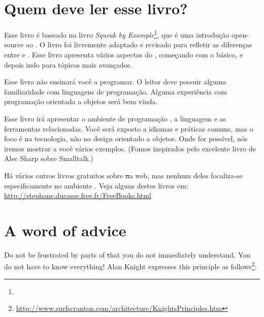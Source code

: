 \documentclass[a4paper,10pt,twoside]{book}
\begin{document}
\section*{Quem deve ler esse livro?}

Esse livro é baseado no livro \emph{Squeak by Example}\footnote{\sbe}, que é uma introdução open-source ao \squeak.
O livro foi livremente adaptado e revisado para refletir as diferenças entre \pharo e \squeak.
Esse livro apresenta vários aspectos do \pharo, começando com o básico, e depois indo para tópicos mais avançados.

Esse livro não ensinará você a programar. O leitor deve possuir alguma familiaridade com linguagens de programação. Alguma experiência com programação orientada a objetos será bem vinda.

Esse livro irá apresentar o ambiente de programação \pharo, a linguagem e as ferramentas relacionadas.  Você será exposto a idiomas e práticas comuns, mas o foco é na tecnologia, não no design orientado a objetos. Onde for possível, nós iremos mostrar a você vários exemplos. (Fomos inspirados pelo excelente livro de Alec Sharp sobre Smalltalk\cite{Shar97a}.)

Há vários outros livros gratuitos sobre \st na web, mas nenhum deles focaliza-se especificamente no ambiente \pharo. Veja alguns destes livros em:
\url{http://stephane.ducasse.free.fr/FreeBooks.html}

\ifluluelse{}{\newpage} %
\section*{A word of advice}


Do not be frustrated by parts of \st that you do not immediately understand.
You do not have to know everything!
Alan Knight expresses this principle as follows\footnote{\url{http://www.surfscranton.com/architecture/KnightsPrinciples.htm}}:
\end{document}
